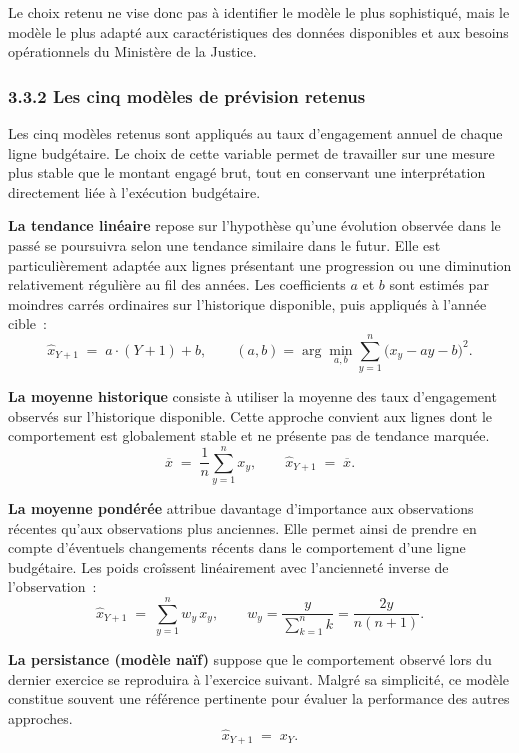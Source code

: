 Le choix retenu ne vise donc pas \`a identifier le mod\`ele le plus
sophistiqu\'e, mais le mod\`ele le plus adapt\'e aux caract\'eristiques des
donn\'ees disponibles et aux besoins op\'erationnels du Minist\`ere de la
Justice.

\subsubsection*{3.3.2 \quad Les cinq mod\`eles de pr\'evision retenus}

Les cinq mod\`eles retenus sont appliqu\'es au taux d'engagement annuel de
chaque ligne budg\'etaire. Le choix de cette variable permet de travailler sur
une mesure plus stable que le montant engag\'e brut, tout en conservant une
interpr\'etation directement li\'ee \`a l'ex\'ecution budg\'etaire.

\textbf{La tendance lin\'eaire} repose sur l'hypoth\`ese qu'une \'evolution
observ\'ee dans le pass\'e se poursuivra selon une tendance similaire dans le
futur. Elle est particuli\`erement adapt\'ee aux lignes pr\'esentant une
progression ou une diminution relativement r\'eguli\`ere au fil des ann\'ees.
Les coefficients $a$ et $b$ sont estim\'es par moindres carr\'es ordinaires sur
l'historique disponible, puis appliqu\'es \`a l'ann\'ee cible~:
$$
\widehat{x}_{Y+1} \;=\; a \cdot (Y+1) + b,
\qquad
(a,b) = \arg\min_{a,b} \sum_{y=1}^{n} \bigl(x_y - a y - b\bigr)^2.
$$

\textbf{La moyenne historique} consiste \`a utiliser la moyenne des taux
d'engagement observ\'es sur l'historique disponible. Cette approche convient
aux lignes dont le comportement est globalement stable et ne pr\'esente pas
de tendance marqu\'ee.
$$
\overline{x} \;=\; \frac{1}{n} \sum_{y=1}^{n} x_y,
\qquad
\widehat{x}_{Y+1} \;=\; \overline{x}.
$$

\textbf{La moyenne pond\'er\'ee} attribue davantage d'importance aux
observations r\'ecentes qu'aux observations plus anciennes. Elle permet ainsi
de prendre en compte d'\'eventuels changements r\'ecents dans le comportement
d'une ligne budg\'etaire. Les poids cro\^issent lin\'eairement avec l'anciennet\'e
inverse de l'observation~:
$$
\widehat{x}_{Y+1} \;=\; \sum_{y=1}^{n} w_y \, x_y,
\qquad
w_y = \frac{y}{\sum_{k=1}^{n} k} = \frac{2y}{n(n+1)}.
$$

\textbf{La persistance (mod\`ele na\"if)} suppose que le comportement observ\'e
lors du dernier exercice se reproduira \`a l'exercice suivant. Malgr\'e sa
simplicit\'e, ce mod\`ele constitue souvent une r\'ef\'erence pertinente pour
\'evaluer la performance des autres approches.
$$
\widehat{x}_{Y+1} \;=\; x_Y .
$$

